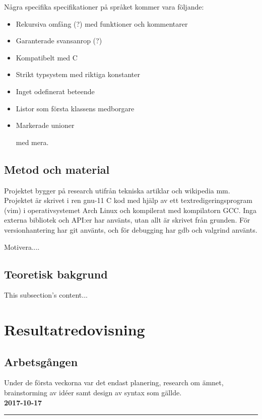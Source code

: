 \documentclass{theme}
\begin{document}
Några specifika specifikationer på språket kommer vara följande: 

\begin{itemize}
	\item Rekursiva omfång (?) med funktioner och kommentarer
	\item Garanterade svansanrop (?)
	\item Kompatibelt med C 
	\item Strikt typsystem med riktiga konstanter
	\item Inget odefinerat beteende
	\item Listor som första klassens medborgare
	\item Markerade unioner

	med mera.
\end{itemize}

\subsection{Metod och material}

Projektet bygger på research utifrån tekniska artiklar och wikipedia mm. 
Projektet är skrivet i ren gnu-11 C kod med hjälp av ett textredigeringsprogram 
(vim) i operativsystemet Arch Linux och kompilerat med kompilatorn GCC. Inga 
externa bibliotek och API:er har använts, utan allt är skrivet från grunden. För
versionhantering har git använts, och för debugging har gdb och valgrind 
använts. 

Motivera....

\subsection{Teoretisk bakgrund}
This subsection's content...

\section{Resultatredovisning}

\subsection{Arbetsgången}

Under de första veckorna var det endast planering, research om ämnet, 
brainstorming av idéer samt design av syntax som gällde. \\

\noindent\textbf{2017-10-17}\\
\noindent\rule{\textwidth}{1pt}
\end{document}
